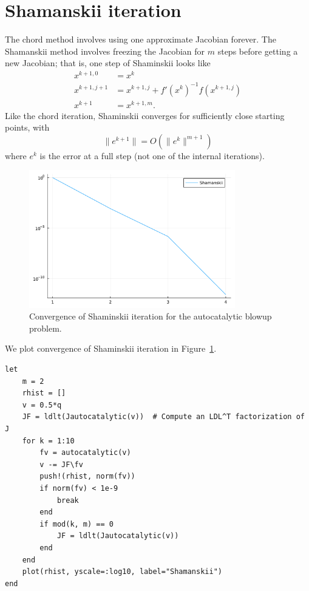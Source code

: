 \documentclass[12pt, leqno]{article} %
\begin{document}
\section{Shamanskii iteration}

The chord method involves using one approximate Jacobian forever. The
Shamanskii method involves freezing the Jacobian for \(m\) steps before
getting a new Jacobian; that is, one step of Shaminskii looks like
\begin{align*}
x^{k+1,0} &= x^k \\
x^{k+1,j+1} &= x^{k+1,j} + f'(x^k)^{-1} f(x^{k+1,j}) \\
x^{k+1} &= x^{k+1,m}.
\end{align*} Like the chord iteration, Shaminskii converges for
sufficiently close starting points, with
\[\|e^{k+1}\| = O(\|e^k\|^{m+1})\] where \(e^k\) is the error at a full
step (not one of the internal iterations).

\begin{figure}
\begin{center}
  \includegraphics[width=0.8\textwidth]{fig/2023-04-12-shaminskii.pdf}
\end{center}
\caption{Convergence of Shaminskii iteration for the autocatalytic blowup problem.}
\label{fig:shaminskii-cvg}
\end{figure}

We plot convergence of Shaminskii iteration in Figure~\ref{fig:shaminskii-cvg}.

\begin{verbatim}
let
    m = 2
    rhist = []
    v = 0.5*q
    JF = ldlt(Jautocatalytic(v))  # Compute an LDL^T factorization of J
    for k = 1:10
    	fv = autocatalytic(v)
    	v -= JF\fv
    	push!(rhist, norm(fv))
    	if norm(fv) < 1e-9
            break
    	end
    	if mod(k, m) == 0
            JF = ldlt(Jautocatalytic(v))
    	end
    end
    plot(rhist, yscale=:log10, label="Shamanskii")
end
\end{verbatim}
\end{document}
